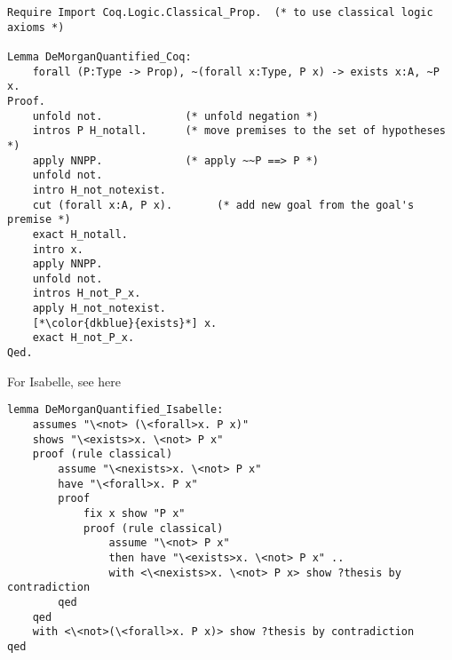 \documentclass[article]{aaltoseries}
\begin{document}
\begin{lstlisting}[language=coq]
Require Import Coq.Logic.Classical_Prop.  (* to use classical logic axioms *)

Lemma DeMorganQuantified_Coq:
    forall (P:Type -> Prop), ~(forall x:Type, P x) -> exists x:A, ~P x.
Proof.
    unfold not.             (* unfold negation *)
    intros P H_notall.      (* move premises to the set of hypotheses *)
    apply NNPP.             (* apply ~~P ==> P *)
    unfold not.
    intro H_not_notexist.
    cut (forall x:A, P x).       (* add new goal from the goal's premise *)
    exact H_notall.
    intro x.
    apply NNPP.
    unfold not.
    intros H_not_P_x.
    apply H_not_notexist.
    [*\color{dkblue}{exists}*] x.
    exact H_not_P_x.
Qed.
\end{lstlisting}

For Isabelle, see here %
\begin{lstlisting}[language=isabelle]
lemma DeMorganQuantified_Isabelle:
    assumes "\<not> (\<forall>x. P x)"
    shows "\<exists>x. \<not> P x"
    proof (rule classical)
        assume "\<nexists>x. \<not> P x"
        have "\<forall>x. P x"
        proof
            fix x show "P x"
            proof (rule classical)
                assume "\<not> P x"
                then have "\<exists>x. \<not> P x" ..
                with <\<nexists>x. \<not> P x> show ?thesis by contradiction
        qed
    qed
    with <\<not>(\<forall>x. P x)> show ?thesis by contradiction
qed
\end{lstlisting}


\end{document}
